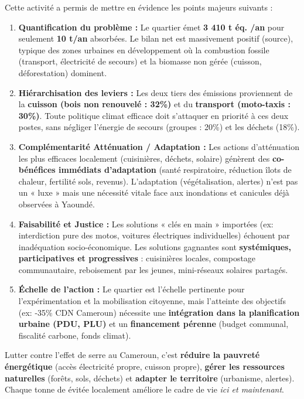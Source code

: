 \documentclass[11pt]{article}
\newcounter{popsec}
\newcounter{popsub}
\newcommand{\courssub}[1]{%
  \stepcounter{popsub}%
  \par\vspace{9pt}\noindent{\popxbold\fontsize{11.5}{13}\selectfont\color{popink}{\color{poporange}\thepopsec.\thepopsub}\hspace{6pt}#1}\par\nopagebreak\vspace{4pt}
}
\begin{document}
\courssub{Bilan de l'activité}
Cette activité a permis de mettre en évidence les points majeurs suivants :
\begin{enumerate}
    \item \textbf{Quantification du problème :} Le quartier émet \textbf{3 410 t éq. /an} pour seulement \textbf{10 t/an} absorbées. Le bilan net est massivement positif (source), typique des zones urbaines en développement où la combustion fossile (transport, électricité de secours) et la biomasse non gérée (cuisson, déforestation) dominent.
    \item \textbf{Hiérarchisation des leviers :} Les deux tiers des émissions proviennent de la \textbf{cuisson (bois non renouvelé : 32\%)} et du \textbf{transport (moto-taxis : 30\%)}. Toute politique climat efficace doit s'attaquer en priorité à ces deux postes, sans négliger l'énergie de secours (groupes : 20\%) et les déchets (18\%).
    \item \textbf{Complémentarité Atténuation / Adaptation :} Les actions d'atténuation les plus efficaces localement (cuisinières, déchets, solaire) génèrent des \textbf{co-bénéfices immédiats d'adaptation} (santé respiratoire, réduction îlots de chaleur, fertilité sols, revenus). L'adaptation (végétalisation, alertes) n'est pas un « luxe » mais une nécessité vitale face aux inondations et canicules déjà observées à Yaoundé.
    \item \textbf{Faisabilité et Justice :} Les solutions « clés en main » importées (ex: interdiction pure des motos, voitures électriques individuelles) échouent par inadéquation socio-économique. Les solutions gagnantes sont \textbf{systémiques, participatives et progressives} : cuisinières locales, compostage communautaire, reboisement par les jeunes, mini-réseaux solaires partagés.
    \item \textbf{Échelle de l'action :} Le quartier est l'échelle pertinente pour l'expérimentation et la mobilisation citoyenne, mais l'atteinte des objectifs (ex: -35\% CDN Cameroun) nécessite une \textbf{intégration dans la planification urbaine (PDU, PLU)} et un \textbf{financement pérenne} (budget communal, fiscalité carbone, fonds climat).
\end{enumerate}
\begin{aretenir}
Lutter contre l'effet de serre au Cameroun, c'est \textbf{réduire la pauvreté énergétique} (accès électricité propre, cuisson propre), \textbf{gérer les ressources naturelles} (forêts, sols, déchets) et \textbf{adapter le territoire} (urbanisme, alertes). Chaque tonne de  évitée localement améliore le cadre de vie \emph{ici et maintenant}.
\end{aretenir}
\end{document}

